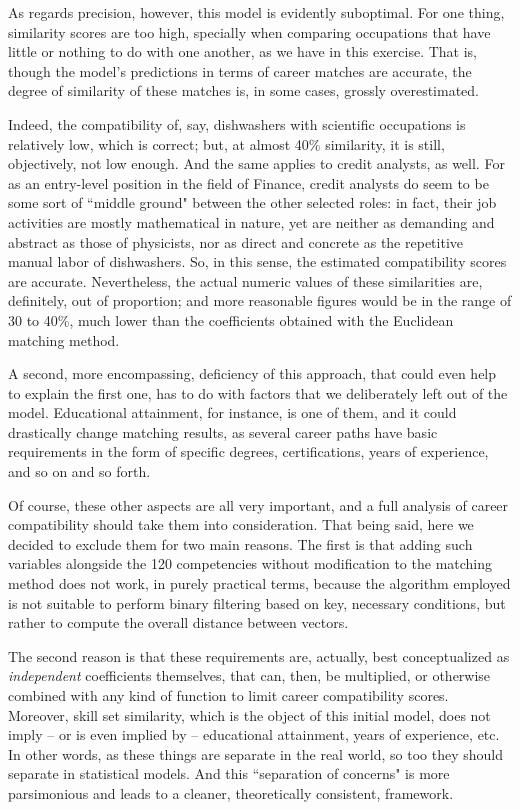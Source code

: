 \documentclass{article}
\begin{document}
As regards precision, however, this model is evidently suboptimal. For one thing, similarity scores are too high, specially when comparing occupations that have little or nothing to do with one another, as we have in this exercise. That is, though the model's predictions in terms of career matches are accurate, the degree of similarity of these matches is, in some cases, grossly overestimated. 

Indeed, the compatibility of, say, dishwashers with scientific occupations is relatively low, which is correct; but, at almost 40\% similarity, it is still, objectively, not low enough. And the same applies to credit analysts, as well. For as an entry-level position in the field of Finance, credit analysts do seem to be some sort of ``middle ground" between the other selected roles: in fact, their job activities are mostly mathematical in nature, yet are neither as demanding and abstract as those of physicists, nor as direct and concrete as the repetitive manual labor of dishwashers. So, in this sense, the estimated compatibility scores are accurate. Nevertheless, the actual numeric values of these similarities are, definitely, out of proportion; and more reasonable figures would be in the range of 30 to 40\%, much lower than the coefficients obtained with the Euclidean matching method.

A second, more encompassing, deficiency of this approach, that could even help to explain the first one, has to do with factors that we deliberately left out of the model. Educational attainment, for instance, is one of them, and it could drastically change matching results, as several career paths have basic requirements in the form of specific degrees, certifications, years of experience, and so on and so forth. 

Of course, these other aspects are all very important, and a full analysis of career compatibility should take them into consideration. That being said, here we decided to exclude them for two main reasons. The first is that adding such variables alongside the 120 competencies without modification to the matching method does not work, in purely practical terms, because the algorithm employed is not suitable to perform binary filtering based on key, necessary conditions, but rather to compute the overall distance between vectors.

The second reason is that these requirements are, actually, best conceptualized as \textit{independent} coefficients themselves, that can, then, be multiplied, or otherwise combined with any kind of function to limit career compatibility scores. Moreover, skill set similarity, which is the object of this initial model, does not imply -- or is even implied by -- educational attainment, years of experience, etc. In other words, as these things are separate in the real world, so too they should separate in statistical models. And this ``separation of concerns" is more parsimonious and leads to a cleaner, theoretically consistent, framework.
\end{document}
